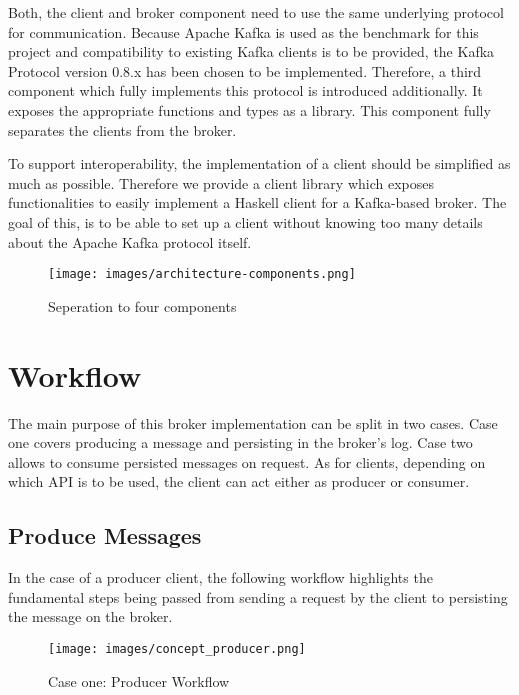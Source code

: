 Both, the client and broker component need to use the same underlying protocol
for communication. Because Apache Kafka is used as the benchmark for this project
and compatibility to existing Kafka clients is to be provided, the Kafka
Protocol version 0.8.x has been chosen to be implemented. Therefore, a third
component which fully implements this protocol is introduced additionally. It
exposes the appropriate functions and types as a library. This component fully
separates the clients from the broker. 

To support interoperability, the implementation of a client should be simplified
as much as possible. Therefore we provide a client library which exposes functionalities to
easily implement a Haskell client for a Kafka-based broker. The goal of this, is to be able to
set up a client without knowing too many details about the Apache Kafka protocol
itself.

\begin{figure}[H]
    \centering
    \texttt{[image: images/architecture-components.png]}
    \caption{Seperation to four components}
    \label{fig:architecture-components.png}
\end{figure}

\section{Workflow}

The main purpose of this broker implementation can be split in two cases. Case
one covers producing a message and persisting in the broker's log. Case two
allows to consume persisted messages on request. As for clients, depending on
which API is to be used, the client can act either as producer or consumer.

\subsection{Produce Messages}

In the case of a producer client, the following workflow highlights the
fundamental steps being passed from sending a request by the client to
persisting the message on the broker.

\begin{figure}[H]
    \centering
    \texttt{[image: images/concept\_producer.png]}
    \caption{Case one: Producer Workflow}
    \label{fig:conept-producer}
\end{figure}

